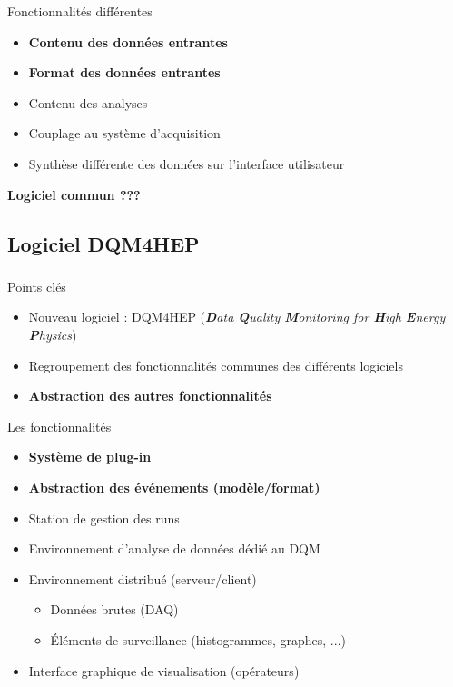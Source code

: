 \documentclass[8pt]{beamer}
\begin{document}
\begin{frame}
\begin{minipage}{0.47\linewidth}
\begin{block}{Fonctionnalités différentes}
        \begin{itemize}
          \item \textbf{Contenu des données entrantes}
          \item \textbf{Format des données entrantes}
          \item Contenu des analyses
          \item Couplage au système d'acquisition
          \item Synthèse différente des données sur l'interface utilisateur
        \end{itemize}
      \end{block}
    \end{minipage}
    \pause
    \begin{center} \textbf{Logiciel commun ???} \end{center}
  \end{frame}


  \subsection{Logiciel DQM4HEP}

  \begin{frame}
  \frametitle{\secname}
  \framesubtitle{\subsecname}
    \begin{block}{Points clés}
      \begin{itemize}
        \item Nouveau logiciel : DQM4HEP (\textit{\textbf{D}ata \textbf{Q}uality \textbf{M}onitoring for \textbf{H}igh \textbf{E}nergy \textbf{P}hysics})
        \item Regroupement des fonctionnalités communes des différents logiciels
        \item \textbf{Abstraction des autres fonctionnalités}
      \end{itemize}
    \end{block}
    \pause
    \begin{block}{Les fonctionnalités}
      \begin{itemize}
        \item \textbf{Système de plug-in}
        \item \textbf{Abstraction des événements (modèle/format)}
        \item Station de gestion des runs
        \item Environnement d'analyse de données dédié au DQM
        \item Environnement distribué (serveur/client)
        \begin{itemize}
          \item Données brutes (DAQ)
          \item Éléments de surveillance (histogrammes, graphes, ...)
        \end{itemize}
        \item Interface graphique de visualisation (opérateurs)
      \end{itemize}
    \end{block}
  \end{frame}
\end{document}

